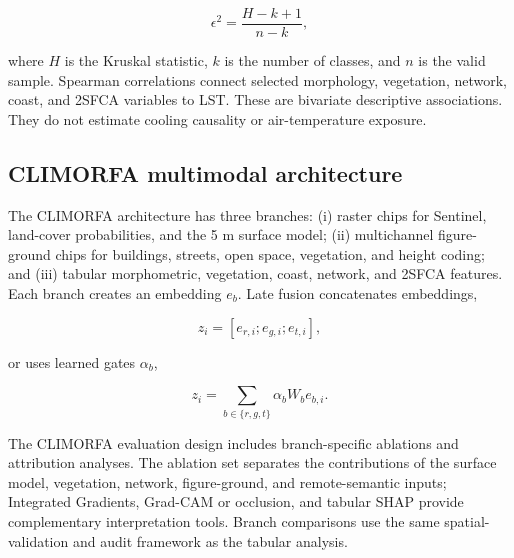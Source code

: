 \begin{equation}
\epsilon^2=\frac{H-k+1}{n-k},
\end{equation}

where $H$ is the Kruskal statistic, $k$ is the number of classes, and $n$ is the
valid sample. Spearman correlations connect selected morphology, vegetation,
network, coast, and 2SFCA variables to LST. These are bivariate descriptive
associations. They do not estimate cooling causality or air-temperature
exposure.

\subsection{CLIMORFA multimodal architecture}

The CLIMORFA architecture has three branches: (i) raster chips for
Sentinel, land-cover probabilities, and the 5 m surface model; (ii) multichannel
figure-ground chips for buildings, streets, open space, vegetation, and height
coding; and (iii) tabular morphometric, vegetation, coast, network, and 2SFCA
features. Each branch creates an embedding $e_b$. Late fusion concatenates
embeddings,

\begin{equation}
z_i=[e_{r,i};e_{g,i};e_{t,i}],
\end{equation}

or uses learned gates $\alpha_b$,

\begin{equation}
z_i=\sum_{b\in\{r,g,t\}}\alpha_b W_b e_{b,i}.
\end{equation}

The CLIMORFA evaluation design includes branch-specific ablations and attribution analyses. The ablation set separates the contributions of the surface model, vegetation, network, figure-ground, and remote-semantic inputs; Integrated Gradients, Grad-CAM or occlusion, and tabular SHAP provide complementary interpretation tools. Branch comparisons use the same spatial-validation and audit framework as the tabular analysis.

